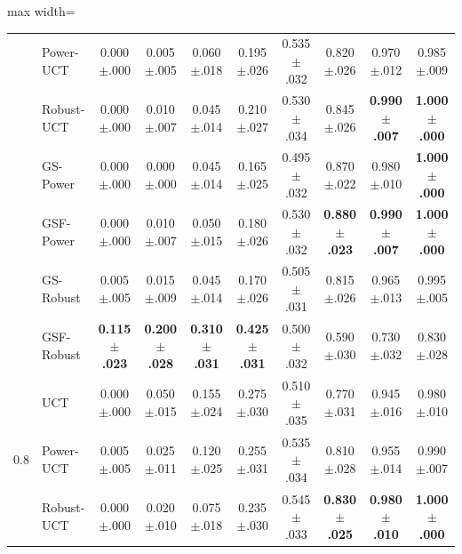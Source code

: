 \begin{table}
\begin{adjustbox}{max width=\linewidth}
\begin{tabular}{llcccccccc}
 & Power-UCT & 0.000{\scriptsize$\pm$.000} & 0.005{\scriptsize$\pm$.005} & 0.060{\scriptsize$\pm$.018} & 0.195{\scriptsize$\pm$.026} & 0.535{\scriptsize$\pm$.032} & 0.820{\scriptsize$\pm$.026} & 0.970{\scriptsize$\pm$.012} & 0.985{\scriptsize$\pm$.009} \\
 & Robust-UCT & 0.000{\scriptsize$\pm$.000} & 0.010{\scriptsize$\pm$.007} & 0.045{\scriptsize$\pm$.014} & 0.210{\scriptsize$\pm$.027} & 0.530{\scriptsize$\pm$.034} & 0.845{\scriptsize$\pm$.026} & \textbf{0.990{\scriptsize$\pm$.007}} & \textbf{1.000{\scriptsize$\pm$.000}} \\
 & GS-Power & 0.000{\scriptsize$\pm$.000} & 0.000{\scriptsize$\pm$.000} & 0.045{\scriptsize$\pm$.014} & 0.165{\scriptsize$\pm$.025} & 0.495{\scriptsize$\pm$.032} & 0.870{\scriptsize$\pm$.022} & 0.980{\scriptsize$\pm$.010} & \textbf{1.000{\scriptsize$\pm$.000}} \\
 & GSF-Power & 0.000{\scriptsize$\pm$.000} & 0.010{\scriptsize$\pm$.007} & 0.050{\scriptsize$\pm$.015} & 0.180{\scriptsize$\pm$.026} & 0.530{\scriptsize$\pm$.032} & \textbf{0.880{\scriptsize$\pm$.023}} & \textbf{0.990{\scriptsize$\pm$.007}} & \textbf{1.000{\scriptsize$\pm$.000}} \\
 & GS-Robust & 0.005{\scriptsize$\pm$.005} & 0.015{\scriptsize$\pm$.009} & 0.045{\scriptsize$\pm$.014} & 0.170{\scriptsize$\pm$.026} & 0.505{\scriptsize$\pm$.031} & 0.815{\scriptsize$\pm$.026} & 0.965{\scriptsize$\pm$.013} & 0.995{\scriptsize$\pm$.005} \\
 & GSF-Robust & \textbf{0.115{\scriptsize$\pm$.023}} & \textbf{0.200{\scriptsize$\pm$.028}} & \textbf{0.310{\scriptsize$\pm$.031}} & \textbf{0.425{\scriptsize$\pm$.031}} & 0.500{\scriptsize$\pm$.032} & 0.590{\scriptsize$\pm$.030} & 0.730{\scriptsize$\pm$.032} & 0.830{\scriptsize$\pm$.028} \\
\midrule
\multirow{7}{*}{0.8} & UCT & 0.000{\scriptsize$\pm$.000} & 0.050{\scriptsize$\pm$.015} & 0.155{\scriptsize$\pm$.024} & 0.275{\scriptsize$\pm$.030} & 0.510{\scriptsize$\pm$.035} & 0.770{\scriptsize$\pm$.031} & 0.945{\scriptsize$\pm$.016} & 0.980{\scriptsize$\pm$.010} \\
 & Power-UCT & 0.005{\scriptsize$\pm$.005} & 0.025{\scriptsize$\pm$.011} & 0.120{\scriptsize$\pm$.025} & 0.255{\scriptsize$\pm$.031} & 0.535{\scriptsize$\pm$.034} & 0.810{\scriptsize$\pm$.028} & 0.955{\scriptsize$\pm$.014} & 0.990{\scriptsize$\pm$.007} \\
 & Robust-UCT & 0.000{\scriptsize$\pm$.000} & 0.020{\scriptsize$\pm$.010} & 0.075{\scriptsize$\pm$.018} & 0.235{\scriptsize$\pm$.030} & 0.545{\scriptsize$\pm$.033} & \textbf{0.830{\scriptsize$\pm$.025}} & \textbf{0.980{\scriptsize$\pm$.010}} & \textbf{1.000{\scriptsize$\pm$.000}} \\

\end{tabular}
\end{adjustbox}
\end{table}
